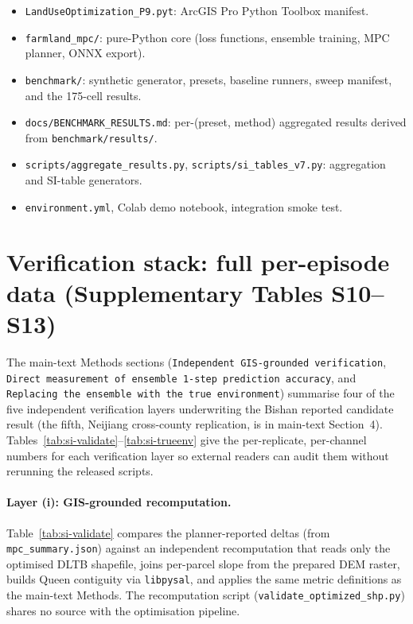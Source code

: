 \documentclass[11pt]{article}
\begin{document}
\begin{itemize}
\item \texttt{LandUseOptimization\_P9.pyt}: ArcGIS Pro Python Toolbox manifest.
\item \texttt{farmland\_mpc/}: pure-Python core (loss functions, ensemble training, MPC planner, ONNX export).
\item \texttt{benchmark/}: synthetic generator, presets, baseline runners, sweep manifest, and the 175-cell results.
\item \texttt{docs/BENCHMARK\_RESULTS.md}: per-(preset, method) aggregated results derived from \texttt{benchmark/results/}.
\item \texttt{scripts/aggregate\_results.py}, \texttt{scripts/si\_tables\_v7.py}: aggregation and SI-table generators.
\item \texttt{environment.yml}, Colab demo notebook, integration smoke test.
\end{itemize}

\section{Verification stack: full per-episode data (Supplementary Tables S10--S13)}\label{si:s5-verification}

The main-text Methods sections (\texttt{Independent GIS-grounded verification}, \texttt{Direct measurement of ensemble 1-step prediction accuracy}, and \texttt{Replacing the ensemble with the true environment}) summarise four of the five independent verification layers underwriting the Bishan reported candidate result (the fifth, Neijiang cross-county replication, is in main-text Section~4). Tables~\ref{tab:si-validate}--\ref{tab:si-trueenv} give the per-replicate, per-channel numbers for each verification layer so external readers can audit them without rerunning the released scripts.

\paragraph{Layer (i): GIS-grounded recomputation.} Table~\ref{tab:si-validate} compares the planner-reported deltas (from \texttt{mpc\_summary.json}) against an independent recomputation that reads only the optimised DLTB shapefile, joins per-parcel slope from the prepared DEM raster, builds Queen contiguity via \texttt{libpysal}, and applies the same metric definitions as the main-text Methods. The recomputation script (\texttt{validate\_optimized\_shp.py}) shares no source with the optimisation pipeline.
\end{document}
